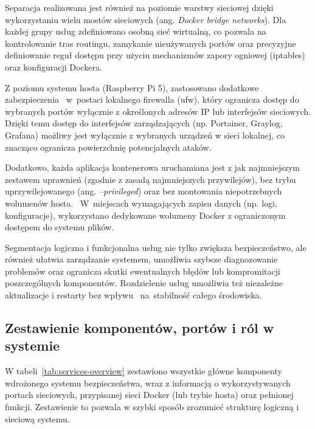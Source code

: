 \documentclass[
    left=2.5cm,         %
    right=2.5cm,        %
    top=2.5cm,          %
    bottom=3cm,         %
    bindingoffset=6mm,  %
    nohyphenation=true %
]{eiti/eiti-thesis} %
\begin{document}
Separacja realizowana jest również na poziomie warstwy sieciowej dzięki wykorzystaniu wielu mostów sieciowych (ang. \textit{Docker bridge networks}). Dla każdej grupy usług zdefiniowano osobną sieć wirtualną, co pozwala na kontrolowanie tras routingu, zamykanie nieużywanych portów oraz precyzyjne definiowanie reguł dostępu przy użyciu mechanizmów zapory ogniowej (iptables) oraz konfiguracji Dockera.

Z poziomu systemu hosta (Raspberry Pi 5), zastosowano dodatkowe zabezpieczenia ~w~postaci lokalnego firewalla (ufw), który ogranicza dostęp do wybranych portów wyłącznie z określonych adresów IP lub interfejsów sieciowych. Dzięki temu dostęp do interfejsów zarządzających (np. Portainer, Graylog, Grafana) możliwy 
jest wyłącznie z wybranych urządzeń w sieci lokalnej, co znacząco ogranicza powierzchnię potencjalnych ataków.

Dodatkowo, każda aplikacja kontenerowa uruchamiana jest z jak najmniejszym zestawem uprawnień (zgodnie z zasadą najmniejszych przywilejów), bez trybu uprzywilejowanego (ang. \textit{--privileged}) oraz bez montowania niepotrzebnych wolumenów hosta. ~W~miejscach wymagających zapisu danych (np. logi, konfiguracje), wykorzystano dedykowane wolumeny Docker z ograniczonym dostępem do systemu plików.

Segmentacja logiczna i funkcjonalna usług nie tylko zwiększa bezpieczeństwo, ale również ułatwia zarządzanie systemem, umożliwia szybsze diagnozowanie problemów oraz ogranicza skutki ewentualnych błędów lub kompromitacji poszczególnych komponentów. Rozdzielenie usług umożliwia też niezależne aktualizacje i restarty bez wpływu 
~na~stabilność całego środowiska.

\subsection{Zestawienie komponentów, portów i ról w systemie}

W tabeli~\ref{tab:services-overview} zestawiono wszystkie główne komponenty wdrożonego systemu bezpieczeństwa, wraz z informacją o wykorzystywanych portach sieciowych, przypisanej sieci Docker (lub trybie hosta) oraz pełnionej funkcji. Zestawienie to pozwala w szybki sposób zrozumieć strukturę logiczną i sieciową systemu.
\end{document}
